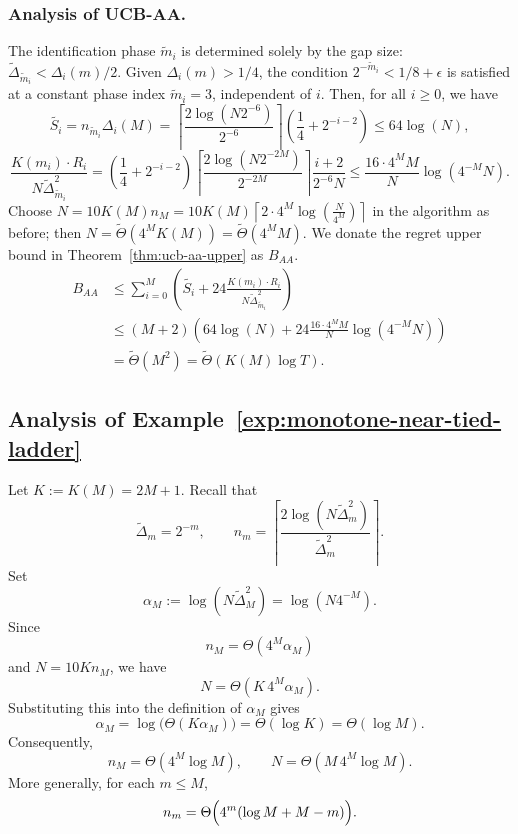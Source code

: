 \documentclass[11pt]{article}
\begin{document}
\subsubsection*{Analysis of UCB-AA.}
The identification phase $\tilde{m}_i$ is determined solely by the gap size: $\tilde{\Delta}_{\tilde{m}_i} < \Delta_i(m)/2$. Given $\Delta_i(m) > 1/4$, the condition $2^{-\tilde{m}_i} < 1/8 + \epsilon$ is satisfied at a constant phase index $\tilde{m}_i = 3$, independent of $i$. Then, for all $i\geq0$, we have
\[
\tilde{S_i}=n_{\tilde{m}_i}\Delta_i(M)=\left\lceil \frac{2 \log(N 2^{-6})}{2^{-6}} \right\rceil \left( \frac{1}{4} + 2^{-i-2} \right) \leq 64\log(N),
\]
\[
\frac{K(m_i)\cdot R_i}{N\tilde{\Delta}_{\tilde{m}_i}^2} = \left( \frac{1}{4} + 2^{-i-2} \right) \left\lceil \frac{2 \log(N 2^{-2M})}{2^{-2M}} \right\rceil\frac{i+2}{2^{-6}N}\leq \frac{16 \cdot4^MM}{N}\log(4^{-M}N).
\]
Choose $N=10K(M)n_{M}=10 K(M) \left\lceil 2\cdot 4^M\log\left(\frac{N}{4^M}\right) \right\rceil$ in the algorithm as before; then $N=\tilde{\Theta}(4^MK(M))=\tilde{\Theta}(4^MM)$. We donate the regret upper bound in Theorem~\ref{thm:ucb-aa-upper} as $B_{AA}$.
\[
\begin{aligned}
B_{AA} &\le  \sum_{i=0}^{M}  \left(\tilde{S_i}+ 24\frac{K(m_i)\cdot R_i}{N\tilde{\Delta}_{\tilde{m}_i}^2}\right)\\
&\leq (M+2)\left(64\log(N) + 24\frac{16 \cdot4^MM}{N}\log(4^{-M}N)\right)\\
&= \tilde{\Theta}(M^2)=\tilde{\Theta}(K(M)\log T).
\end{aligned}
\]





\subsection{Analysis of Example~\ref{exp:monotone-near-tied-ladder}}
\label{sec:Analysis of exp:monotone-near-tied-ladder}

Let $K:=K(M)=2M+1$. Recall that
\[
\tilde\Delta_m = 2^{-m},
\qquad
n_m
=
\left\lceil
\frac{2\log(N\tilde\Delta_m^2)}{\tilde\Delta_m^2}
\right\rceil.
\]
Set
\[
\alpha_M := \log(N\tilde\Delta_M^2)=\log(N4^{-M}).
\]
Since
\[
n_M = \Theta(4^M\alpha_M)
\]
and $N=10Kn_M$, we have
\[
N=\Theta(K\,4^M\alpha_M).
\]
Substituting this into the definition of $\alpha_M$ gives
\[
\alpha_M = \log\bigl(\Theta(K\alpha_M)\bigr)=\Theta(\log K)=\Theta(\log M).
\]
Consequently,
\[
n_M=\Theta(4^M\log M),
\qquad
N=\Theta(M\,4^M\log M).
\]
More generally, for each $m\le M$,
\begin{equation}
\label{eq:nm-growth}
n_m
=
\Theta\Bigl(4^m(\log M+M-m)\Bigr).
\end{equation}
\end{document}
